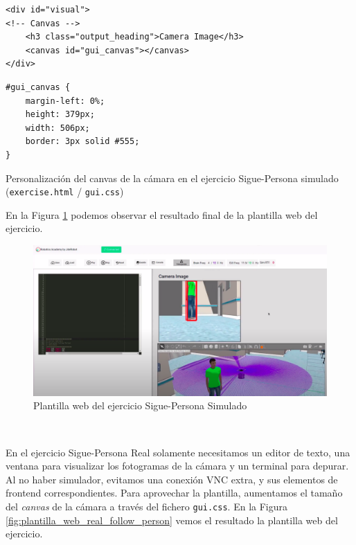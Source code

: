 \begin{code}
\begin{lstlisting}
<div id="visual">
<!-- Canvas -->
	<h3 class="output_heading">Camera Image</h3>
	<canvas id="gui_canvas"></canvas>
</div>
\end{lstlisting}
\begin{lstlisting}
#gui_canvas {
    margin-left: 0%;
    height: 379px;
    width: 506px;
    border: 3px solid #555;
}
\end{lstlisting}
\caption[Personalización del canvas de la cámara en el ejercicio Sigue-Persona simulado]{Personalización del canvas de la cámara en el ejercicio Sigue-Persona simulado (\texttt{exercise.html} / \texttt{gui.css})}
\label{cod:canvas_camara}
\end{code}

En la Figura \ref{fig:plantilla_web_simulated_follow_person} podemos observar el resultado final de la plantilla web del ejercicio.\\

\begin{figure} [H]
  \begin{center}
    \includegraphics[width=15cm]{imagenes/cap5/plantilla-web-simulated-follow-person.png}
  \end{center}
  \caption[Plantilla web del ejercicio Sigue-Persona Simulado]{Plantilla web del ejercicio Sigue-Persona Simulado}
  \label{fig:plantilla_web_simulated_follow_person}
\end{figure}\

En el ejercicio Sigue-Persona Real solamente necesitamos un editor de texto, una ventana para visualizar los fotogramas de la cámara y un terminal para depurar. Al no haber simulador, evitamos una conexión VNC extra, y sus elementos de frontend correspondientes. Para aprovechar la plantilla, aumentamos el tamaño del \textit{canvas} de la cámara a través del fichero \texttt{gui.css}. En la Figura \ref{fig:plantilla_web_real_follow_person} vemos el resultado la plantilla web del ejercicio.\\


